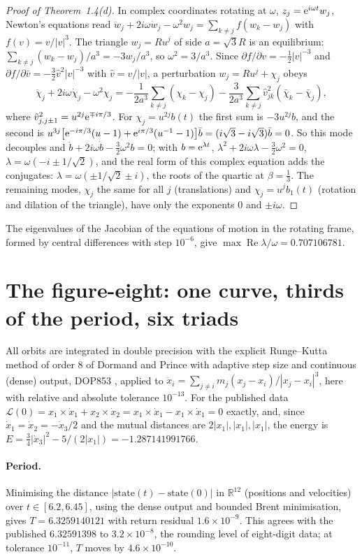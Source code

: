 \documentclass[11pt]{article}
\theoremstyle{definition}\newtheorem{definition}[theorem]{Definition}
\theoremstyle{remark}\newtheorem{remark}[theorem]{Remark}
\newcommand{\R}{\mathbb R}\newcommand{\C}{\mathbb C}\newcommand{\N}{\mathbb N}
\renewcommand{\Re}{\operatorname{Re}}\renewcommand{\Im}{\operatorname{Im}}
\begin{document}
\begin{proof}[Proof of Theorem~1.4(d)]
In complex coordinates rotating at $\omega$, $z_j=\mathrm e^{i\omega t}w_j$, Newton's equations read $\ddot w_j+2i\omega\dot w_j-\omega^2w_j=\sum_{k\ne j}f(w_k-w_j)$ with $f(v)=v/|v|^3$. The triangle $w_j=Ru^j$ of side $a=\sqrt3R$ is an equilibrium: $\sum_{k\ne j}(w_k-w_j)/a^3=-3w_j/a^3$, so $\omega^2=3/a^3$. Since $\partial f/\partial v=-\tfrac12|v|^{-3}$ and $\partial f/\partial\bar v=-\tfrac32\hat v^2|v|^{-3}$ with $\hat v=v/|v|$, a perturbation $w_j=Ru^j+\chi_j$ obeys
\[
\ddot\chi_j+2i\omega\dot\chi_j-\omega^2\chi_j=-\frac1{2a^3}\sum_{k\ne j}(\chi_k-\chi_j)-\frac3{2a^3}\sum_{k\ne j}\hat v_{jk}^2(\bar\chi_k-\bar\chi_j),
\]
where $\hat v_{j,j\pm1}^2=u^{2j}\mathrm e^{\mp i\pi/3}$. For $\chi_j=u^{2j}b(t)$ the first sum is $-3u^{2j}b$, and the second is $u^{3j}\bigl[\mathrm e^{-i\pi/3}(u-1)+\mathrm e^{i\pi/3}(u^{-1}-1)\bigr]\bar b=(i\sqrt3-i\sqrt3)\bar b=0$. So this mode decouples and $\ddot b+2i\omega\dot b-\tfrac32\omega^2b=0$; with $b=\mathrm e^{\lambda t}$, $\lambda^2+2i\omega\lambda-\tfrac32\omega^2=0$, $\lambda=\omega(-i\pm1/\sqrt2)$, and the real form of this complex equation adds the conjugates: $\lambda=\omega(\pm1/\sqrt2\pm i)$, the roots of the quartic at $\beta=\tfrac13$. The remaining modes, $\chi_j$ the same for all $j$ (translations) and $\chi_j=u^jb_1(t)$ (rotation and dilation of the triangle), have only the exponents $0$ and $\pm i\omega$.
\end{proof}
The eigenvalues of the Jacobian of the equations of motion in the rotating frame, formed by central differences with step $10^{-6}$, give $\max\Re\lambda/\omega=0.707106781$.

\section{The figure-eight: one curve, thirds of the period, six triads}\label{sec:eight}
All orbits are integrated in double precision with the explicit Runge--Kutta method of order 8 of Dormand and Prince with adaptive step size and continuous (dense) output, DOP853 \cite{HNW}, applied to $\ddot x_i=\sum_{j\ne i}m_j(x_j-x_i)/|x_j-x_i|^3$, here with relative and absolute tolerance $10^{-13}$. For the published data $\mathcal L(0)=x_1\times\dot x_1+x_2\times\dot x_2=x_1\times\dot x_1-x_1\times\dot x_1=0$ exactly, and, since $\dot x_1=\dot x_2=-\dot x_3/2$ and the mutual distances are $2|x_1|,|x_1|,|x_1|$, the energy is $E=\tfrac34|\dot x_3|^2-5/(2|x_1|)=-1.287141991766$.

\paragraph{Period.} Minimising the distance $|\mathrm{state}(t)-\mathrm{state}(0)|$ in $\R^{12}$ (positions and velocities) over $t\in[6.2,6.45]$, using the dense output and bounded Brent minimisation, gives $T=6.3259140121$ with return residual $1.6\times10^{-9}$. This agrees with the published $6.32591398$ to $3.2\times10^{-8}$, the rounding level of eight-digit data; at tolerance $10^{-11}$, $T$ moves by $4.6\times10^{-10}$.
\end{document}
